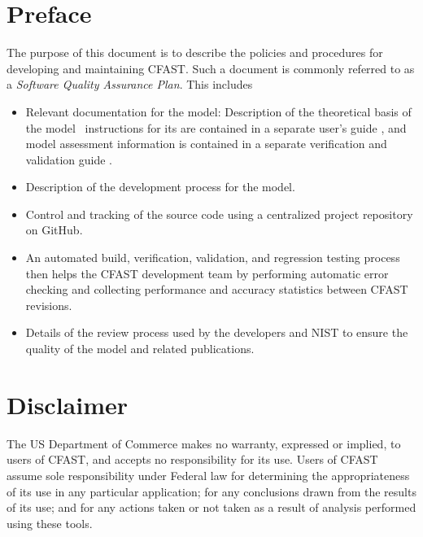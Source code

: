 \documentclass[12pt]{book}
\begin{document}
\newpage

\frontmatter

\pagestyle{plain}
\setcounter{page}{3}




\chapter{Preface}

The purpose of this document is to describe the policies and procedures for developing and maintaining CFAST. Such a document is commonly referred to as a {\em Software Quality Assurance Plan}.  This includes

\begin{itemize}
    \item Relevant documentation for the model: Description of the theoretical basis of the model \cite{CFAST_Tech_Guide_7}\, instructions for its are contained in a separate user's guide \cite{CFAST_Users_Guide_7}, and model assessment information is contained in a separate verification and validation guide \cite{CFAST_Valid_Guide_7}.
    
    \item Description of the development process for the model.

    \item Control and tracking of the source code using a centralized project repository on GitHub.

    \item An automated build, verification, validation, and regression testing process then helps the CFAST development team by performing automatic error checking and collecting performance and accuracy statistics between CFAST revisions.

    \item Details of the review process used by the developers and NIST to ensure the quality of the model and related publications.

\end{itemize}

\chapter{Disclaimer}

The US Department of Commerce makes no warranty, expressed or implied, to users of CFAST, and accepts no responsibility for its use. Users of CFAST assume sole responsibility under Federal law for determining the appropriateness of its use in any particular application; for any conclusions drawn from the results of its use; and for any actions taken or not taken as a result of analysis performed using these tools.
\end{document}
